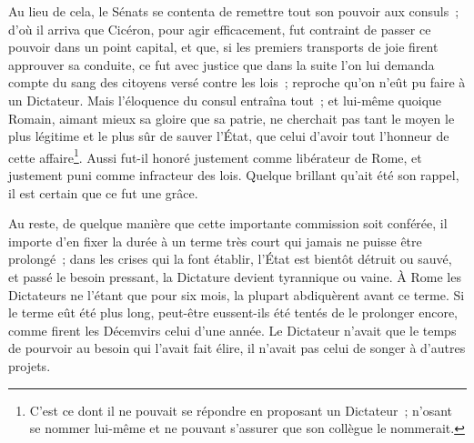 \documentclass[french,twoside]{book} %
\begin{document}
Au lieu de cela, le Sénats se contenta de remettre tout son pouvoir aux consuls ; d’où il arriva que Cicéron, pour agir efficacement, fut contraint de passer ce pouvoir dans un point capital, et que, si les premiers transports de joie firent approuver sa conduite, ce fut avec justice que dans la suite l’on lui demanda compte du sang des citoyens versé contre les lois ; reproche qu’on n’eût pu faire à un Dictateur. Mais l’éloquence du consul entraîna tout ; et lui-même quoique Romain, aimant mieux sa gloire que sa patrie, ne cherchait pas tant le moyen le plus légitime et le plus sûr de sauver l’État, que celui d’avoir tout l’honneur de cette affaire\footnote{C’est ce dont il ne pouvait se répondre en proposant un Dictateur ; n’osant se nommer lui-même et ne pouvant s’assurer que son collègue le nommerait.}. Aussi fut-il honoré justement comme libérateur de Rome, et justement puni comme infracteur des lois. Quelque brillant qu’ait été son rappel, il est certain que ce fut une grâce.\par
Au reste, de quelque manière que cette importante commission soit conférée, il importe d’en fixer la durée à un terme très court qui jamais ne puisse être prolongé ; dans les crises qui la font établir, l’État est bientôt détruit ou sauvé, et passé le besoin pressant, la Dictature devient tyrannique ou vaine. À Rome les Dictateurs ne l’étant que pour six mois, la plupart abdiquèrent avant ce terme. Si le terme eût été plus long, peut-être eussent-ils été tentés de le prolonger encore, comme firent les Décemvirs celui d’une année. Le Dictateur n’avait que le temps de pourvoir au besoin qui l’avait fait élire, il n’avait pas celui de songer à d’autres projets.
\end{document}
